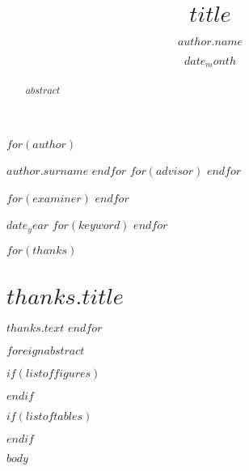 \documentclass[english,$doc_type$,numbers,hidelinks]{coppe}
\begin{document}
  \title{$title$}
  $for(author)$
  \author{$author.name$}{$author.surname$}
  $endfor$
  $for(advisor)$
  $endfor$


  $for(examiner)$
  $endfor$
  \date{$date_month$}{$date_year$}
  $for(keyword)$
  $endfor$
  
  \maketitle

  \frontmatter
  
  \dedication{$dedication$}
  $for(thanks)$
  \chapter*{$thanks.title$}
  $thanks.text$
  $endfor$

  \begin{abstract}
  $abstract$
  \end{abstract}

  \pagebreak

  \begin{foreignabstract}
  $foreignabstract$
  \end{foreignabstract}

  \tableofcontents
  
  $if(listoffigures)$
  \listoffigures
  $endif$

  $if(listoftables)$
  \listoftables
  $endif$

  \printlosymbols
  \printloabbreviations

  \mainmatter
  $body$
\end{document}

